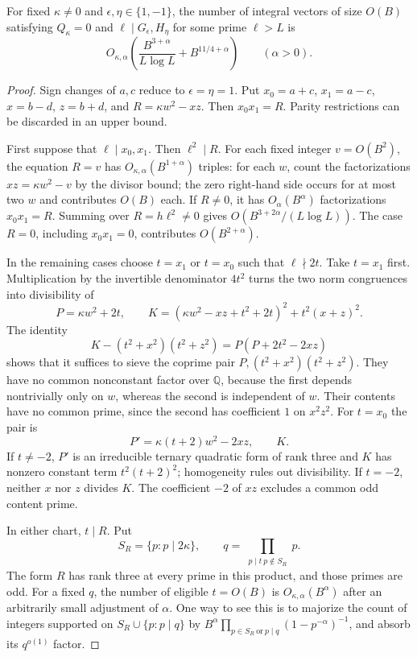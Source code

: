 \begin{lemma}\label{lem:v5-large-sieve}
For fixed $\kappa\ne0$ and $\epsilon,\eta\in\{1,-1\}$, the number of
integral vectors of size $O(B)$ satisfying $Q_\kappa=0$ and
$\ell\mid G_\epsilon,H_\eta$ for some prime $\ell>L$ is
\begin{equation}\label{eq:v5-large-sieve}
 O_{\kappa,\alpha}\left(
    \frac{B^{3+\alpha}}{L\log L}+B^{11/4+\alpha}\right)
 \qquad(\alpha>0).
\end{equation}
\end{lemma}
\begin{proof}
Sign changes of $a,c$ reduce to $\epsilon=\eta=1$.
Put $x_0=a+c$, $x_1=a-c$, $x=b-d$, $z=b+d$, and
$R=\kappa w^2-xz$. Then $x_0x_1=R$.
Parity restrictions can be discarded in an upper bound.

First suppose that $\ell\mid x_0,x_1$. Then $\ell^2\mid R$.
For each fixed integer $v=O(B^2)$, the equation $R=v$ has
$O_{\kappa,\alpha}(B^{1+\alpha})$ triples: for each $w$, count the
factorizations $xz=\kappa w^2-v$ by the divisor bound; the zero right-hand
side occurs for at most two $w$ and contributes $O(B)$ each.
If $R\ne0$, it has $O_\alpha(B^\alpha)$ factorizations $x_0x_1=R$.
Summing over $R=h\ell^2\ne0$ gives
$O(B^{3+2\alpha}/(L\log L))$.
The case $R=0$, including $x_0x_1=0$, contributes $O(B^{2+\alpha})$.

In the remaining cases choose $t=x_1$ or $t=x_0$ such that $\ell\nmid2t$.
Take $t=x_1$ first. Multiplication by the invertible denominator $4t^2$
turns the two norm congruences into divisibility of
\[
 P=\kappa w^2+2t,\qquad
 K=(\kappa w^2-xz+t^2+2t)^2+t^2(x+z)^2.
\]
The identity
\[
 K-(t^2+x^2)(t^2+z^2)=P(P+2t^2-2xz)
\]
shows that it suffices to sieve the coprime pair
$P,(t^2+x^2)(t^2+z^2)$. They have no common nonconstant factor over
$\mathbb Q$, because the first depends nontrivially only on $w$, whereas
the second is independent of $w$. Their contents have no common prime,
since the second has coefficient $1$ on $x^2z^2$.
For $t=x_0$ the pair is
\[
 P'=\kappa(t+2)w^2-2xz,\qquad K.
\]
If $t\ne-2$, $P'$ is an irreducible ternary quadratic form of rank three
and $K$ has nonzero constant term $t^2(t+2)^2$; homogeneity rules out
divisibility. If $t=-2$, neither $x$ nor $z$ divides $K$.
The coefficient $-2$ of $xz$ excludes a common odd content prime.

In either chart, $t\mid R$. Put
\[
 S_R=\{p:p\mid2\kappa\},\qquad
 q=\prod_{\substack{p\mid t\ p\notin S_R}}p.
\]
The form $R$ has rank three at every prime in this product, and those primes
are odd. For a fixed $q$, the number of eligible $t=O(B)$ is
$O_{\kappa,\alpha}(B^\alpha)$ after an arbitrarily small adjustment of
$\alpha$. One way to see this is to majorize the count of integers
supported on $S_R\cup\{p:p\mid q\}$ by
$B^\alpha\prod_{p\in S_R\ \text{or}\ p\mid q}(1-p^{-\alpha})^{-1}$,
and absorb its $q^{o(1)}$ factor.


\end{proof}

